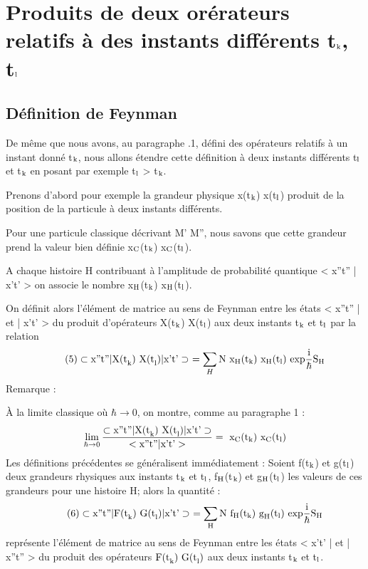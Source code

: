 \section{Produits de deux orérateurs relatifs à des instants différents t$_{\text{k}}$, t$_{\text{l}}$}%
\subsection{Définition de Feynman}%

De même que nous avons, au paragraphe .1, défini des opérateurs
relatifs à un instant donné t$_{\text{k}}$, nous allons étendre cette définition à deux
instants différents t$_{\text{l}}$ et t$_{\text{k}}$ en posant par exemple t$_{\text{l}}$ > t$_{\text{k}}$.

Prenons d'abord pour exemple la grandeur physique x(t$_{\text{k}}$) x(t$_{\text{l}}$)
produit de la position de la particule à deux instants différents.

Pour une particule classique décrivant M' M'', nous savons que
cette grandeur prend la valeur bien définie  x$_{\text{C}}$(t$_{\text{k}}$) x$_{\text{C}}$(t$_{\text{l}}$).

A chaque histoire H contribuant à l'amplitude de probabilité
quantique < x''t'' | x't' > on associe le nombre x$_{\text{H}}$(t$_{\text{k}}$) x$_{\text{H}}$(t$_{\text{l}}$).

On définit alors l'élément de matrice au sens de Feynman entre
les états < x''t'' | et | x't' > du produit d'opérateurs X(t$_{\text{k}}$) X(t$_{\text{l}}$) aux
deux instants t$_{\text{k}}$ et t$_{\text{l}}$ par la relation
\[
\tag{5}\subset \text{x''t''} | \text{X(t}_{\text{k}}) \text{ X(t}_{\text{l}}) | \text{x't'}\supset\ =
\sum_H \text{N x}_{\text{H}}(\text{t}_{\text{k}}) \text{ x}_{\text{H}}(\text{t}_{\text{l}})
\text{ exp}\frac{\text{i}}{\hbar}\text{S}_{\text{H}}
\]
Remarque :

À la limite classique où $\hbar \to 0$, on montre, comme au paragraphe 1 :
$$ \lim_{\hbar \to 0} \frac{\subset \text{x''t''} | \text{X(t}_{\text{k}}) \text{ X(t}_{\text{l}}) | \text{x't'}\supset}
{< \text{x''t''} | \text{x't'}>} = \text{ x}_{\text{C}}(\text{t}_{\text{k}}) \text{ x}_{\text{C}}(\text{t}_{\text{l}})$$
Les définitions précédentes se généralisent immédiatement :
Soient f(t$_{\text{k}}$) et g(t$_{\text{l}}$) deux grandeurs rhysiques aux instants t$_{\text{k}}$ et t$_{\text{l}}$,
f$_{\text{H}}$(t$_{\text{k}}$) et g$_{\text{H}}$(t$_{\text{l}}$) les valeurs de ces grandeurs pour une histoire H; alors
la quantité :
\[
\tag{6}\subset \text{x''t''} | \text{F(t}_{\text{k}}) \text{ G(t}_{\text{l}}) | \text{x't'}\supset\ =
\sum_{\text{H}} \text{N f}_{\text{H}}(\text{t}_{\text{k}}) \text{ g}_{\text{H}}(\text{t}_{\text{l}})
\text{ exp}\frac{\text{i}}{\hbar}\text{S}_{\text{H}}
\]
représente l'élément de matrice au sens de Feynman entre les états < x't' |
et | x''t'' > du produit des opérateurs $\text{F(t}_{\text{k}}) \text{ G(t}_{\text{l}})$ aux deux instants t$_{\text{k}}$
et t$_{\text{l}}$.

